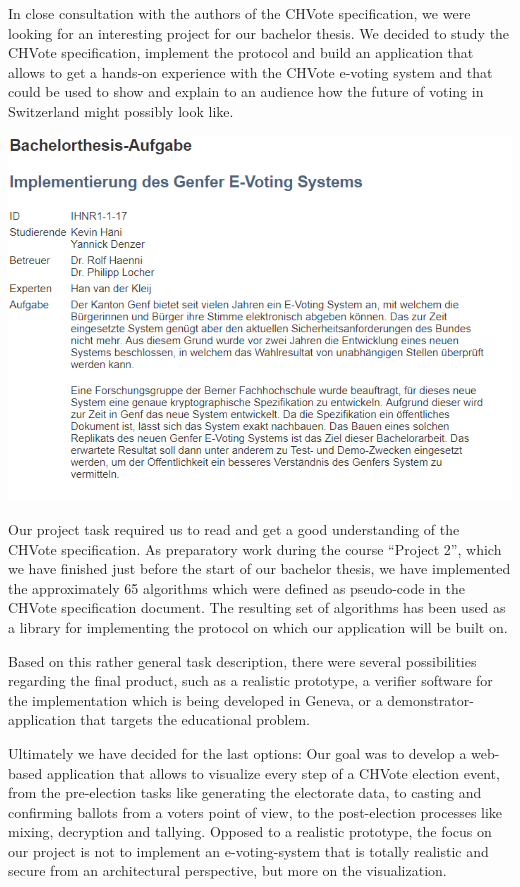 In close consultation with the authors of the CHVote specification, we were looking for an interesting project for our bachelor thesis. We decided to study the CHVote specification, implement the protocol and build an application that allows to get a hands-on experience with the CHVote e-voting system and that could be used to show and explain to an audience how the future of voting in Switzerland might possibly look like.

\begin{center}
\includegraphics[scale=0.95]{assets/aufgabe.PNG}
\label{Bachelor thesis task}%
\end{center}

Our project task required us to read and get a good understanding of the CHVote specification. As preparatory work during the course "`Project 2"', which we have finished just before the start of our bachelor thesis, we have implemented the approximately 65 algorithms which were defined as pseudo-code in the CHVote specification document. The resulting set of algorithms has been used as a library for implementing the protocol on which our application will be built on.

Based on this rather general task description, there were several possibilities regarding the final product, such as a realistic prototype, a verifier software for the implementation which is being developed in Geneva, or a demonstrator-application that targets the educational problem. 

Ultimately we have decided for the last options: Our goal was to develop a web-based application that allows to visualize every step of a CHVote election event, from the pre-election tasks like generating the electorate data, to casting and confirming ballots from a voters point of view, to the post-election processes like mixing, decryption and tallying. Opposed to a realistic prototype, the focus on our project is not to implement an e-voting-system that is totally realistic and secure from an architectural perspective, but more on the visualization.  

